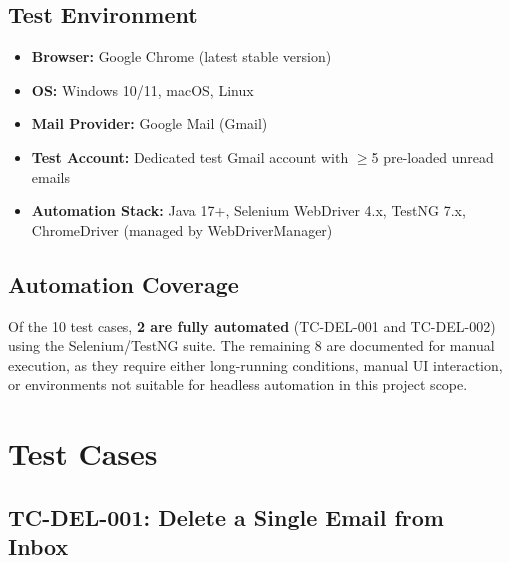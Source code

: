 \documentclass[12pt,a4paper]{article}
\begin{document}
\subsection{Test Environment}
\begin{itemize}[noitemsep]
    \item \textbf{Browser:} Google Chrome (latest stable version)
    \item \textbf{OS:} Windows 10/11, macOS, Linux
    \item \textbf{Mail Provider:} Google Mail (Gmail)
    \item \textbf{Test Account:} Dedicated test Gmail account with $\geq$5 pre-loaded unread emails
    \item \textbf{Automation Stack:} Java 17+, Selenium WebDriver 4.x, TestNG 7.x, ChromeDriver (managed by WebDriverManager)
\end{itemize}

\subsection{Automation Coverage}
Of the 10 test cases, \textbf{2 are fully automated} (TC-DEL-001 and TC-DEL-002) using the Selenium/TestNG suite. The remaining 8 are documented for manual execution, as they require either long-running conditions, manual UI interaction, or environments not suitable for headless automation in this project scope.

\newpage

\section{Test Cases}

\subsection{TC-DEL-001: Delete a Single Email from Inbox}
\end{document}
